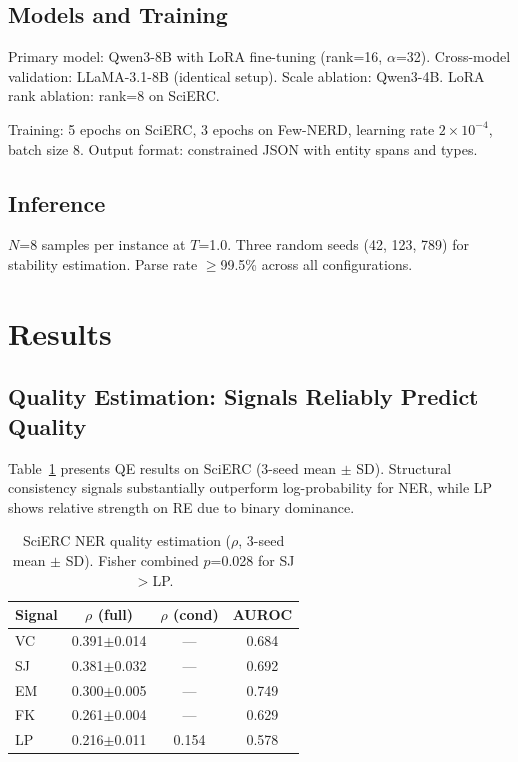 \documentclass[11pt]{article}
\begin{document}
\subsection{Models and Training}

Primary model: Qwen3-8B with LoRA fine-tuning (rank=16, $\alpha$=32). Cross-model validation: LLaMA-3.1-8B (identical setup). Scale ablation: Qwen3-4B. LoRA rank ablation: rank=8 on SciERC.

Training: 5 epochs on SciERC, 3 epochs on Few-NERD, learning rate $2\times10^{-4}$, batch size 8. Output format: constrained JSON with entity spans and types.

\subsection{Inference}

$N$=8 samples per instance at $T$=1.0. Three random seeds (42, 123, 789) for stability estimation. Parse rate $\geq$99.5\% across all configurations.

\section{Results}

\subsection{Quality Estimation: Signals Reliably Predict Quality}

Table~\ref{tab:qe_scierc} presents QE results on SciERC (3-seed mean $\pm$ SD). Structural consistency signals substantially outperform log-probability for NER, while LP shows relative strength on RE due to binary dominance.

\begin{table}[t]
\centering
\small
\caption{SciERC NER quality estimation ($\rho$, 3-seed mean $\pm$ SD). Fisher combined $p$=0.028 for SJ$>$LP.}
\label{tab:qe_scierc}
\begin{tabular}{lccc}
\toprule
Signal & $\rho$ (full) & $\rho$ (cond) & AUROC \\
\midrule
VC & 0.391$\pm$0.014 & — & 0.684 \\
SJ & 0.381$\pm$0.032 & — & 0.692 \\
EM & 0.300$\pm$0.005 & — & 0.749 \\
FK & 0.261$\pm$0.004 & — & 0.629 \\
LP & 0.216$\pm$0.011 & 0.154 & 0.578 \\
\bottomrule
\end{tabular}
\end{table}
\end{document}
